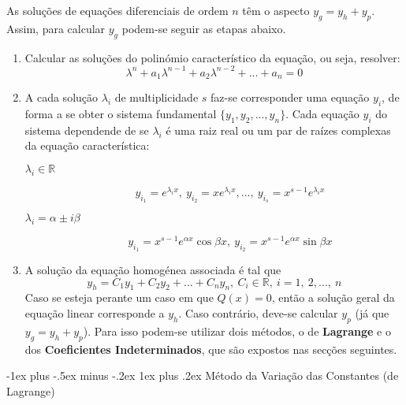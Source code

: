 \documentclass[10pt,landscape]{article}
\makeatletter
\newcommand{\RNum}[1]{\uppercase\expandafter{\romannumeral #1\relax}}
\renewcommand{\subsubsection}{\@startsection{subsubsection}{3}{0mm}%
                                {-1ex plus -.5ex minus -.2ex}%
                                {1ex plus .2ex}%
                                {\normalfont\small\bfseries}}
\makeatother
\begin{document}
\begin{multicols}{3}
As soluções de equações diferenciais de ordem $n$ têm o aspecto $y_g = y_h + y_p$. Assim, para calcular $y_g$ podem-se seguir as etapas abaixo.
\begin{enumerate}
\item Calcular as soluções do polinómio característico da equação, ou seja, resolver:
$$\lambda^n + a_1 \lambda^{n-1} + a_2 \lambda^{n-2} + ... + a_n = 0$$
\item A cada solução $\lambda_i$ de multiplicidade $s$ faz-se corresponder uma equação $y_i$, de forma a se obter o sistema fundamental $\{y_1, y_2, ..., y_n\}$. Cada equação $y_i$ do sistema dependende de se $\lambda_i$ é uma raiz real ou um par de raízes complexas da equação característica:
\begin{description}
\item[$\lambda_i \in \mathbb{R}$]
$$y_{i_1} = e^{\lambda_i x},\ y_{i_2} = x e^{\lambda_i x}, ...,\ y_{i_s} = x^{s-1} e^{\lambda_i x}$$
\item[$\lambda_i = \alpha \pm i \beta$]
$$y_{i_1} = x^{s-1} e^{\alpha x} \cos{\beta x},\ y_{i_2} = x^{s-1} e^{\alpha x} \sin{\beta x}$$
\end{description}
\item A solução da equação homogénea associada é tal que
$$y_h = C_1 y_1 + C_2 y_2 + ... + C_n y_n,\ C_i \in \mathbb{R},\ i = 1,\ 2, ...,\ n$$
Caso se esteja perante um caso em que $Q(x) = 0$, então a solução geral da equação linear corresponde a $y_h$. Caso contrário, deve-se calcular $y_p$ (já que $y_g = y_h + y_p$). Para isso podem-se utilizar dois métodos, o de \textbf{Lagrange} e o dos \textbf{Coeficientes Indeterminados}, que são expostos nas secções seguintes.
\end{enumerate}

\subsubsection{\texorpdfstring{\RNum{1}}{TEXT} Método da Variação das Constantes (de Lagrange)}


\end{multicols}
\end{document}
